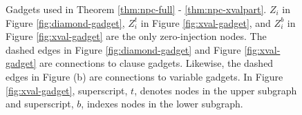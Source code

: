\begin{figure}[t]

	\caption{Gadgets used in Theorem \ref{thm:npc-full} - \ref{thm:npc-xvalpart}. $Z_i$ in Figure \ref{fig:diamond-gadget}, $Z_i^t$ in Figure \ref{fig:xval-gadget}, and $Z_i^b$ in Figure \ref{fig:xval-gadget} are the only zero-injection nodes.
	The dashed edges in Figure \ref{fig:diamond-gadget} and Figure \ref{fig:xval-gadget} are connections to clause gadgets. Likewise, the dashed edges in Figure (b) are connections to variable gadgets.  In Figure \ref{fig:xval-gadget},
	superscript, $t$, denotes nodes in the upper subgraph and superscript, $b$, indexes nodes in the lower subgraph.}
  
\label{fig:pmu-gadgets}
\end{figure}

